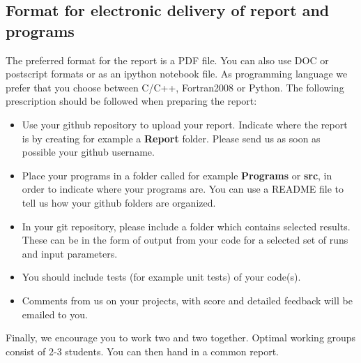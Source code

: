 \documentclass[%
oneside,                 %
final,                   %
10pt]{article}
\begin{document}
\noindent
\subsection*{Format for electronic delivery of report and programs}

The preferred format for the report is a PDF file. You can also use DOC or postscript formats or as an ipython notebook file.  As programming language we prefer that you choose between C/C++, Fortran2008 or Python. The following prescription should be followed when preparing the report:

\begin{itemize}
  \item Use your github repository to upload your report. Indicate where the report is by creating for example a \textbf{Report} folder. Please send us as soon as possible your github username.

  \item Place your programs in a folder called for example \textbf{Programs} or \textbf{src}, in order to indicate where your programs are. You can use a README file to tell us how your github folders are organized. 

  \item In your git repository, please include a folder which contains selected results. These can be in the form of output from your code for a selected set of runs and input parameters.

  \item You should include tests (for example unit tests) of your code(s).

  \item Comments  from us on your projects, with score and detailed feedback will be emailed to you. 
\end{itemize}

\noindent
Finally, 
we encourage you to work two and two together. Optimal working groups consist of 
2-3 students. You can then hand in a common report. 


\end{document}
